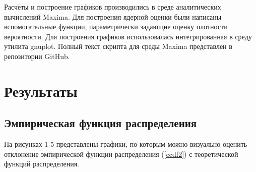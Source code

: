 \documentclass[12pt]{article}
\newcommand{\lskip}{\hfill\break}
\begin{document}
\begin{flushleft}
Расчёты и построение графиков производились в среде аналитических вычислений Maxima. Для построения ядерной оценки были написаны вспомогательные функции, параметрически задающие оценку плотности вероятности. Для построения графиков использовалась интегрированная в среду утилита gnuplot. Полный текст скрипта для среды Maxima представлен в репозитории GitHub.

\newpage

\section{Результаты}

    \subsection{Эмпирическая функция распределения}

       На рисунках 1-5 представлены графики, по которым можно визуально оценить отклонение эмпирической функции распределения (\ref{ecdf2}) с теоретической функций распределения.
       \lskip


\end{flushleft}
\end{document}
